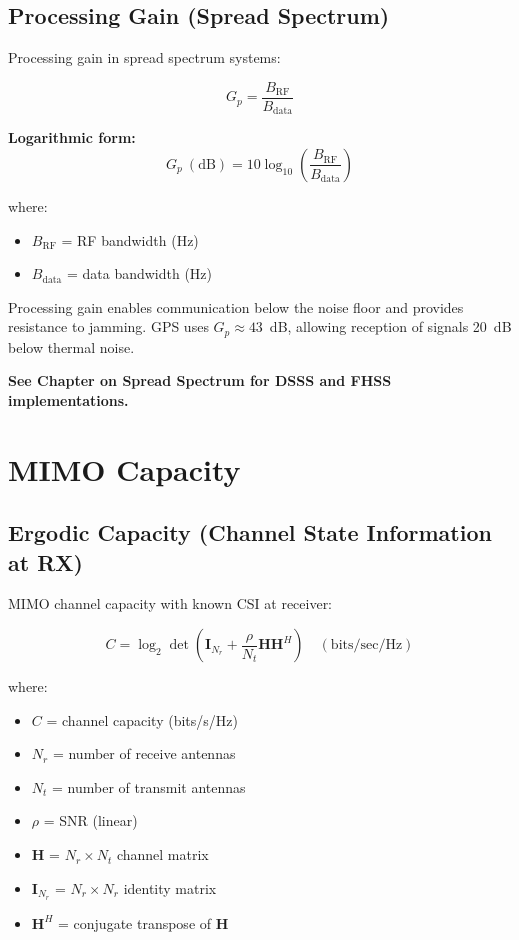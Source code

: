 \subsection{Processing Gain (Spread Spectrum)}
\label{subsec:processing-gain}

Processing gain in spread spectrum systems:

\begin{equation}
\label{eq:processing-gain-linear}
G_p = \frac{B_{\text{RF}}}{B_{\text{data}}}
\end{equation}

\textbf{Logarithmic form:}
\begin{equation}
\label{eq:processing-gain-db}
G_p\ (\text{dB}) = 10\log_{10}\left(\frac{B_{\text{RF}}}{B_{\text{data}}}\right)
\end{equation}

where:
\begin{itemize}
\item $B_{\text{RF}}$ = RF bandwidth (Hz)
\item $B_{\text{data}}$ = data bandwidth (Hz)
\end{itemize}

\begin{importantbox}
Processing gain enables communication below the noise floor and provides resistance to jamming. GPS uses $G_p \approx 43$~dB, allowing reception of signals 20~dB below thermal noise.
\end{importantbox}

\textbf{See Chapter on Spread Spectrum for DSSS and FHSS implementations.}

\section{MIMO Capacity}
\label{sec:mimo-capacity}

\subsection{Ergodic Capacity (Channel State Information at RX)}
\label{subsec:mimo-capacity}

MIMO channel capacity with known CSI at receiver:

\begin{equation}
\label{eq:mimo-capacity}
C = \log_2 \det\left(\mathbf{I}_{N_r} + \frac{\rho}{N_t} \mathbf{HH}^H\right) \quad (\text{bits/sec/Hz})
\end{equation}

where:
\begin{itemize}
\item $C$ = channel capacity (bits/s/Hz)
\item $N_r$ = number of receive antennas
\item $N_t$ = number of transmit antennas
\item $\rho$ = SNR (linear)
\item $\mathbf{H}$ = $N_r \times N_t$ channel matrix
\item $\mathbf{I}_{N_r}$ = $N_r \times N_r$ identity matrix
\item $\mathbf{H}^H$ = conjugate transpose of $\mathbf{H}$
\end{itemize}

